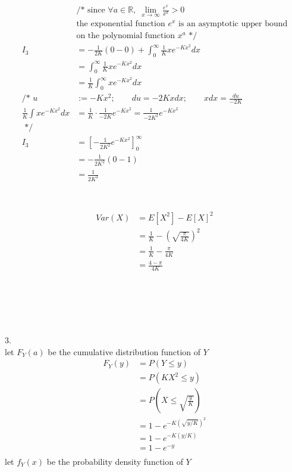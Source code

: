 \documentclass[12pt,border=4pt,multi]{article}%
\begin{document}
\begin{align*}
&\text{/* since } \forall a \in \mathbb{R},\;\lim_{x \rightarrow \infty} \frac{e^x}{x^a} > 0\\
&\text{the exponential function $e^x$ is an asymptotic upper bound}\\
&\text{on the polynomial function $x^a$ */}\\
I_3 &= -\frac{1}{2K}(0 - 0) + \int_0^{\infty}\frac{1}{K}xe^{-Kx^2}dx\\
&= \int_0^{\infty}\frac{1}{K}xe^{-Kx^2}dx\\
&= \frac{1}{K}\int_0^{\infty}xe^{-Kx^2}dx\\
\text{/* } u &:= -Kx^2; \qquad du = -2Kxdx; \qquad xdx = \frac{du}{-2K}\\
\frac{1}{K}\int xe^{-Kx^2}dx &= \frac{1}{K}\cdot\frac{1}{-2K}e^{-Kx^2}
= \frac{1}{-2K^2}e^{-Kx^2}\\
\text{ */}\\
I_3 &= \left[-\frac{1}{2K^2}e^{-Kx^2}\right]_0^{\infty}\\
&= -\frac{1}{2K^2}(0 - 1)\\
&= \frac{1}{2K^2}\\
\end{align*}
\\
\\
\begin{align*}
Var(X) &= E[X^2] - E[X]^2\\
&= \frac{1}{K} - \left(\sqrt{\frac{\pi}{4K}}\right)^2\\
&= \frac{1}{K} - \frac{\pi}{4K}\\
&= \boxed{\frac{4 - \pi}{4K}}\\
\end{align*}
\\
\\
\\
\\
\\
3.\\
let $F_Y(a)$ be the cumulative distribution function of $Y$
\begin{align*}
F_Y(y) &= P(Y \leq y)\\
&= P(KX^2 \leq y)\\
&= P(X \leq \sqrt{\frac{y}{K}})\\
&= 1 - e^{-K\left(\sqrt{y/K}\right)^2}\\
&= 1 - e^{-K(y/K)}\\
&= \boxed{1 - e^{-y}}\\
\end{align*}
let $f_Y(x)$ be the probability density function of $Y$\\
\end{document}

